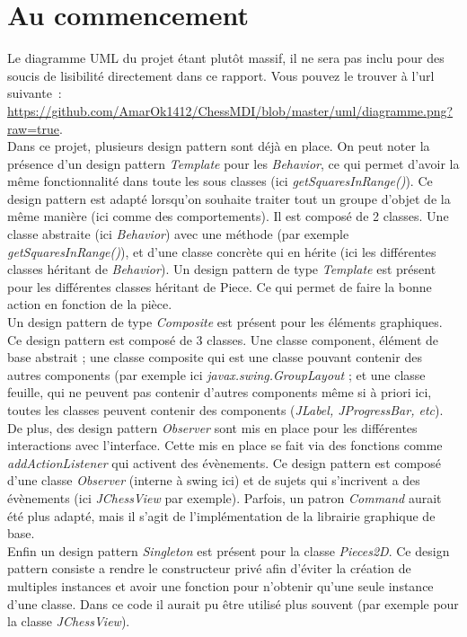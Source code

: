 \documentclass{article}
\begin{document}
	\section{Au commencement}
	\label{sec:Au commencement}
	Le diagramme UML du projet étant plutôt massif, il ne sera pas inclu pour des soucis de lisibilité directement dans ce rapport. Vous pouvez le trouver à l'url suivante~: \url{https://github.com/AmarOk1412/ChessMDI/blob/master/uml/diagramme.png?raw=true}.\\
	Dans ce projet, plusieurs design pattern sont déjà en place. On peut noter la présence d'un design pattern \emph{Template} pour les \emph{Behavior}, ce qui permet d'avoir la même fonctionnalité dans toute les sous classes (ici \emph{getSquaresInRange()}). Ce design pattern est adapté lorsqu'on souhaite traiter tout un groupe d'objet de la même manière (ici comme des comportements). Il est composé de 2 classes. Une classe abstraite (ici \emph{Behavior}) avec une méthode (par exemple \emph{getSquaresInRange()}), et d'une classe concrète qui en hérite (ici les différentes classes héritant de \emph{Behavior}). Un design pattern de type \emph{Template} est présent pour les différentes classes héritant de Piece. Ce qui permet de faire la bonne action en fonction de la pièce.\\
	Un design pattern de type \emph{Composite} est présent pour les éléments graphiques. Ce design pattern est composé de 3 classes. Une classe component, élément de base abstrait ; une classe composite qui est une classe pouvant contenir des autres components (par exemple ici \emph{javax.swing.GroupLayout} ; et une classe feuille, qui ne peuvent pas contenir d'autres components même si à priori ici, toutes les classes peuvent contenir des components (\emph{JLabel, JProgressBar, etc}).\\
	De plus, des design pattern \emph{Observer} sont mis en place pour les différentes interactions avec l'interface. Cette mis en place se fait via des fonctions comme \emph{addActionListener} qui activent des évènements. Ce design pattern est composé d'une classe \emph{Observer} (interne à swing ici) et de sujets qui s'incrivent a des évènements (ici \emph{JChessView} par exemple). Parfois, un patron \emph{Command} aurait été plus adapté, mais il s'agit de l'implémentation de la librairie graphique de base.\\
	Enfin un design pattern \emph{Singleton} est présent pour la classe \emph{Pieces2D}. Ce design pattern consiste a rendre le constructeur privé afin d'éviter la création de multiples instances et avoir une fonction pour n'obtenir qu'une seule instance d'une classe. Dans ce code il aurait pu être utilisé plus souvent (par exemple pour la classe \emph{JChessView}).
\end{document}

